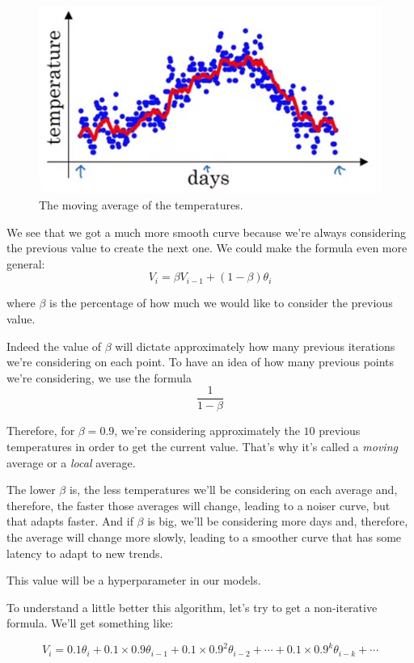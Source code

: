 \documentclass[12pt, a4paper, oneside]{book}
\begin{document}
\begin{figure}[h]
\centering
\includegraphics[scale=0.4]{Res/temperature-average.png}
\caption{The moving average of the temperatures.}
\label{temperature-average.png}
\end{figure}

We see that we got a much more smooth curve because we're always considering the
previous value to create the next one. We could make the formula even more
general:
\[ \boxed{
        V_i=\beta V_{i-1}+(1-\beta)\theta_i
}\]

where $\beta$ is the percentage of how much we would like to consider the
previous value.

Indeed the value of $\beta$ will dictate approximately how many previous
iterations we're considering on each point. To have an idea of how many previous
points we're considering, we use the formula
\[
\dfrac{1}{1-\beta}
\]

Therefore, for $\beta=0.9$, we're considering approximately the $10$ previous
temperatures in order to get the current value. That's why it's called a
\textit{moving} average or a \textit{local} average.

The lower $\beta$ is, the less temperatures we'll be considering on each
average and, therefore, the faster those averages will change, leading to a
noiser curve, but that adapts faster. And if $\beta$ is big, we'll be
considering more days and, therefore, the average will change more slowly,
leading to a smoother curve that has some latency to adapt to new trends.

This value will be a hyperparameter in our models.

To understand a little better this algorithm, let's try to get a non-iterative
formula. We'll get something like:

\[
V_i=0.1\theta_i + 0.1\times 0.9\theta_{i-1} + 0.1\times 0.9^2\theta_{i-2} +
\cdots + 0.1\times 0.9^{k}\theta_{i-k}+\cdots
\]
\end{document}
